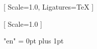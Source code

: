 \usepackage{fontspec}
\usepackage{xeCJK}

\setmainfont{Noto Sans}[
  Scale=1.0,
  Ligatures=TeX
]

[
  Scale=1.0
]

\XeTeXlinebreaklocale "en"
\XeTeXlinebreakskip = 0pt plus 1pt
